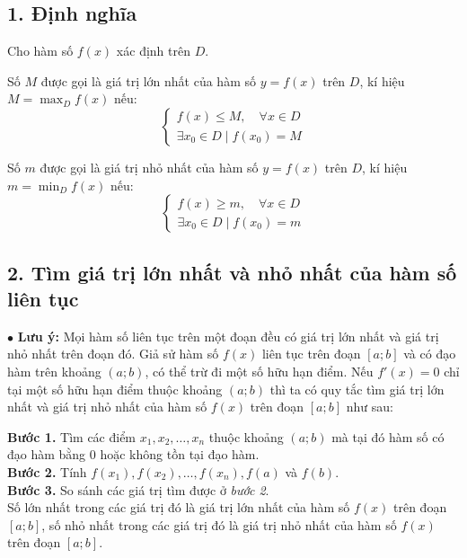 \documentclass[12pt,a4paper]{extarticle}
\begin{document}
\makeheadbox[headerright={Chương 1},chude={Bài 2},tieude={Giá trị lớn nhất và giá trị nhỏ nhất của hàm số},dinhdang={Giải tích},lop={12 },gv={Nguyễn Lê Minh Ngọc}]

\vspace{2em}
\subsection*{1. Định nghĩa}
Cho hàm số $f(x)$ xác định trên $D$.
\begin{doublelinebox}
    Số $M$ được gọi là giá trị lớn nhất của hàm số $y = f(x)$ trên $D$, kí hiệu $M = \max_{D} f(x)$ nếu:
    \[
    \begin{cases}
        f(x) \le M, \quad \forall x \in D \\
        \exists x_0 \in D \mid f(x_0) = M
    \end{cases}
    \]
    
    Số $m$ được gọi là giá trị nhỏ nhất của hàm số $y = f(x)$ trên $D$, kí hiệu $m = \min_{D} f(x)$ nếu:
    \[
    \begin{cases}
        f(x) \ge m, \quad \forall x \in D \\
        \exists x_0 \in D \mid f(x_0) = m
    \end{cases}
    \]
\end{doublelinebox}
\subsection*{2. Tìm giá trị lớn nhất và nhỏ nhất của hàm số liên tục}
\noindent $\bullet$ \textbf{Lưu ý:} Mọi hàm số liên tục trên một đoạn đều có giá trị lớn nhất và giá trị nhỏ nhất trên đoạn đó.
\vspace{0.3cm}
\noindent Giả sử hàm số $f(x)$ liên tục trên đoạn $[a; b]$ và có đạo hàm trên khoảng $(a; b)$, có thể trừ đi một số hữu hạn điểm. Nếu $f'(x) = 0$ chỉ tại một số hữu hạn điểm thuộc khoảng $(a; b)$ thì ta có quy tắc tìm giá trị lớn nhất và giá trị nhỏ nhất của hàm số $f(x)$ trên đoạn $[a; b]$ như sau:
\vspace{0.3cm}
\begin{doublelinebox}
    \noindent \textbf{\color{blue}Bước 1.} Tìm các điểm $x_1, x_2, \dots, x_n$ thuộc khoảng $(a; b)$ mà tại đó hàm số có đạo hàm bằng $0$ hoặc không tồn tại đạo hàm.\\
    
    \noindent \textbf{\color{blue}Bước 2.} Tính $f(x_1), f(x_2), \dots, f(x_n), f(a)$ và $f(b)$.\\
    
    \noindent \textbf{\color{blue}Bước 3.} So sánh các giá trị tìm được ở \textit{bước 2}.\\
    
    \noindent Số lớn nhất trong các giá trị đó là giá trị lớn nhất của hàm số $f(x)$ trên đoạn $[a; b]$, số nhỏ nhất trong các giá trị đó là giá trị nhỏ nhất của hàm số $f(x)$ trên đoạn $[a; b]$.
\end{doublelinebox}
\end{document}
